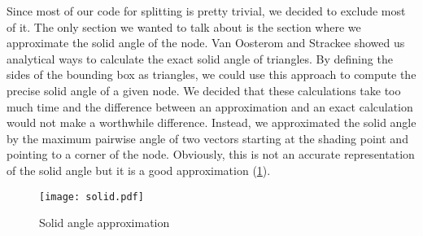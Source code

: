 Since most of our code for splitting is pretty trivial, we decided to exclude most of it. The only section we wanted to talk about is the section where we approximate the solid angle of the node. Van Oosterom and Strackee \cite{SAPT} showed us analytical ways to calculate the exact solid angle of triangles. By defining the sides of the bounding box as triangles, we could use this approach to compute the precise solid angle of a given node. We decided that these calculations take too much time and the difference between an approximation and an exact calculation would not make a worthwhile difference. Instead, we approximated the solid angle by the maximum pairwise angle of two vectors starting at the shading point and pointing to a corner of the node. Obviously, this is not an accurate representation of the solid angle but it is a good approximation (\ref{fig:solid}).

\begin{figure}
	\begin{center}
		\texttt{[image: solid.pdf]}
		\caption{Solid angle approximation}
		\label{fig:solid}
	\end{center}
\end{figure}
